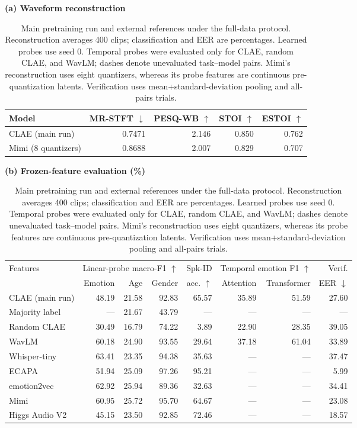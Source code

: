 \documentclass[11pt,a4paper]{article}
\begin{document}
\begin{table}[t]
\centering
\footnotesize
\setlength{\tabcolsep}{3.5pt}
\textbf{(a) Waveform reconstruction}\par\smallskip
\begin{tabular}{@{}lrrrr@{}}
\toprule
Model & MR-STFT $\downarrow$ & PESQ-WB $\uparrow$ & STOI $\uparrow$ & ESTOI $\uparrow$ \\
\midrule
CLAE (main run) & 0.7471 & 2.146 & 0.850 & 0.762 \\
Mimi (8 quantizers) & 0.8688 & 2.007 & 0.829 & 0.707 \\
\bottomrule
\end{tabular}
\par\medskip
\textbf{(b) Frozen-feature evaluation (\%)}\par\smallskip
\begin{tabular}{@{}lrrrrrrr@{}}
\toprule
\multicolumn{1}{l}{Features} & \multicolumn{3}{c}{Linear-probe macro-F1 $\uparrow$} & Spk-ID & \multicolumn{2}{c}{Temporal emotion F1 $\uparrow$} & Verif. \\
\cmidrule(lr){2-4}\cmidrule(lr){6-7}
 & Emotion & Age & Gender & acc. $\uparrow$ & Attention & Transformer & EER $\downarrow$ \\
\midrule
CLAE (main run) & 48.19 & 21.58 & 92.83 & 65.57 & 35.89 & 51.59 & 27.60 \\
Majority label & --- & 21.67 & 43.79 & --- & --- & --- & --- \\
Random CLAE & 30.49 & 16.79 & 74.22 & 3.89 & 22.90 & 28.35 & 39.05 \\
WavLM & 60.18 & 24.90 & 93.55 & 29.64 & 37.18 & 61.04 & 33.89 \\
Whisper-tiny & 63.41 & 23.35 & 94.38 & 35.63 & --- & --- & 37.47 \\
ECAPA & 51.94 & 25.09 & 97.26 & 95.21 & --- & --- & 5.99 \\
emotion2vec & 62.92 & 25.94 & 89.36 & 32.63 & --- & --- & 34.41 \\
Mimi & 60.95 & 25.72 & 95.70 & 64.67 & --- & --- & 23.08 \\
Higgs Audio V2 & 45.15 & 23.50 & 92.85 & 72.46 & --- & --- & 18.57 \\
\bottomrule
\end{tabular}
\caption{Main pretraining run and external references under the full-data protocol. Reconstruction averages 400 clips; classification and EER are percentages. Learned probes use seed 0. Temporal probes were evaluated only for CLAE, random CLAE, and WavLM; dashes denote unevaluated task--model pairs. Mimi's reconstruction uses eight quantizers, whereas its probe features are continuous pre-quantization latents. Verification uses mean+standard-deviation pooling and all-pairs trials.}
\label{tab:main210k}
\end{table}
\end{document}
